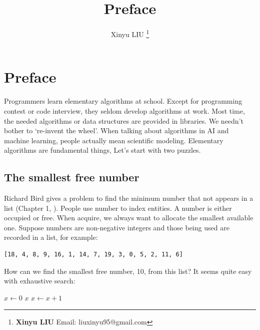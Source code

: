 \documentclass[b5paper]{article}
\begin{document}
\title{Preface}

\author{Xinyu LIU
\thanks{{\bfseries Xinyu LIU} \newline
  Email: liuxinyu95@gmail.com \newline}
  }

\maketitle
\fi


\chapter*{Preface}

Programmers learn elementary algorithms at school. Except for programming contest or code interview, they seldom develop algorithms at work. Most time, the needed algorithms or data structures are provided in libraries. We needn't bother to `re-invent the wheel'. When talking about algorithms in AI and machine learning, people actually mean scientific modeling. Elementary algorithms are fundamental things, Let's start with two puzzles.

\section*{The smallest free number}
\label{min-free} 

Richard Bird gives a problem to find the minimum number that not appears in a list (Chapter 1, \cite{fp-pearls}). People use number to index entities. A number is either occupied or free. When acquire, we always want to allocate the smallest available one. Suppose numbers are non-negative integers and those being used are recorded in a list, for example:

\begin{Verbatim}[fontsize=\footnotesize]
[18, 4, 8, 9, 16, 1, 14, 7, 19, 3, 0, 5, 2, 11, 6]
\end{Verbatim}

How can we find the smallest free number, 10, from this list? It seems quite easy with exhaustive search:

\begin{algorithmic}[1]
  \State $x \gets 0$
  \Loop
      \State \Return $x$
    \Else
      \State $x \gets x + 1$
    \EndIf
  \EndLoop
\EndFunction
\end{algorithmic}
\end{document}

